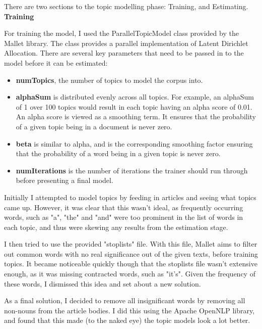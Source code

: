 \documentclass[12pt]{article}
\begin{document}
There are two sections to the topic modelling phase: Training, and Estimating. \\

\textbf{Training}

For training the model, I used the ParallelTopicModel class provided by the Mallet library. The class provides a parallel implementation of Latent Dirichlet Allocation. There are several key parameters that need to be passed in to the model before it can be estimated:

\begin{itemize}
	\item \textbf{numTopics}, the number of topics to model the corpus into.\\
	\item \textbf{alphaSum} is distributed evenly across all topics. For example, an alphaSum of 1 over 100 topics would result in each topic having an alpha score of 0.01. An alpha score is viewed as a smoothing term. It ensures that the probability of a given topic being in a document is never zero.\\
	\item \textbf{beta} is similar to alpha, and is the corresponding smoothing factor ensuring that the probability of a word being in a given topic is never zero.\\
	\item \textbf{numIterations} is the number of iterations the trainer should run through before presenting a final model.\\
\end{itemize}

Initially I attempted to model topics by feeding in articles and seeing what topics came up. However, it was clear that this wasn't ideal, as frequently occurring words, such as "a", "the" and "and" were too prominent in the list of words in each topic, and thus were skewing any results from the estimation stage.

I then tried to use the provided "stoplists" file. With this file, Mallet aims to filter out common words with no real significance out of the given texts, before training topics. It became noticeable quickly though that the stoplists file wasn't extensive enough, as it was missing contracted words, such as "it's". Given the frequency of these words, I dismissed this idea and set about a new solution.

As a final solution, I decided to remove all insignificant words by removing all non-nouns from the article bodies. I did this using the Apache OpenNLP library, and found that this made (to the naked eye) the topic models look a lot better. 
\end{document}
